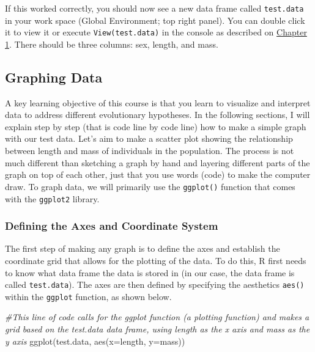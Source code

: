 \documentclass[
]{book}
\newenvironment{Shaded}{\begin{snugshade}}{\end{snugshade}}
\newcommand{\AttributeTok}[1]{\textcolor[rgb]{0.77,0.63,0.00}{#1}}
\newcommand{\CommentTok}[1]{\textcolor[rgb]{0.56,0.35,0.01}{\textit{#1}}}
\newcommand{\FunctionTok}[1]{\textcolor[rgb]{0.00,0.00,0.00}{#1}}
\newcommand{\NormalTok}[1]{#1}
\begin{document}
If this worked correctly, you should now see a new data frame called \texttt{test.data} in your work space (Global Environment; top right panel). You can double click it to view it or execute \texttt{View(test.data)} in the console as described on \href{what-evolution-is.html\#data-frame}{Chapter 1}. There should be three columns: sex, length, and mass.

\hypertarget{graphing-data}{%
\subsection{Graphing Data}\label{graphing-data}}

A key learning objective of this course is that you learn to visualize and interpret data to address different evolutionary hypotheses. In the following sections, I will explain step by step (that is code line by code line) how to make a simple graph with our test data. Let's aim to make a scatter plot showing the relationship between length and mass of individuals in the population. The process is not much different than sketching a graph by hand and layering different parts of the graph on top of each other, just that you use words (code) to make the computer draw. To graph data, we will primarily use the \texttt{ggplot()} function that comes with the \texttt{ggplot2} library.

\hypertarget{defining-the-axes-and-coordinate-system}{%
\subsubsection*{Defining the Axes and Coordinate System}\label{defining-the-axes-and-coordinate-system}}

The first step of making any graph is to define the axes and establish the coordinate grid that allows for the plotting of the data. To do this, R first needs to know what data frame the data is stored in (in our case, the data frame is called \texttt{test.data}). The axes are then defined by specifying the aesthetics \texttt{aes()} within the \texttt{ggplot} function, as shown below.

\begin{Shaded}
\begin{Highlighting}[]
\CommentTok{\#This line of code calls for the ggplot function (a plotting function) and makes a grid based on the test.data data frame, using length as the x axis and mass as the y axis}
\FunctionTok{ggplot}\NormalTok{(test.data, }\FunctionTok{aes}\NormalTok{(}\AttributeTok{x=}\NormalTok{length, }\AttributeTok{y=}\NormalTok{mass))}
\end{Highlighting}
\end{Shaded}
\end{document}
